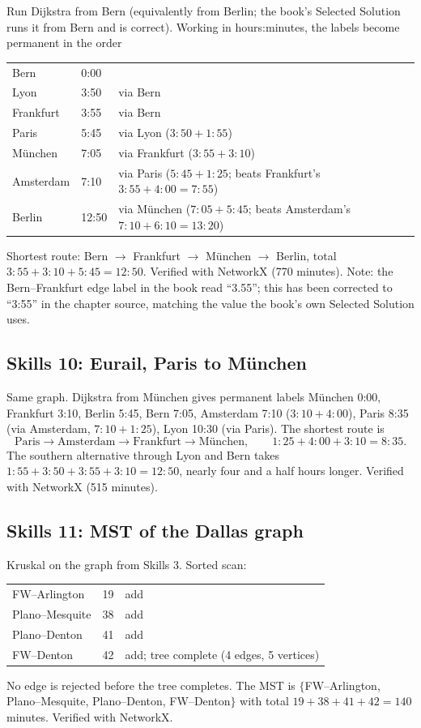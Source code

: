 Run Dijkstra from Bern (equivalently from Berlin; the book's Selected Solution runs it from Bern and is correct). Working in hours:minutes, the labels become permanent in the order
\begin{center}
\begin{tabular}{lll}
Bern & 0:00 & \\
Lyon & 3:50 & via Bern \\
Frankfurt & 3:55 & via Bern \\
Paris & 5:45 & via Lyon ($3{:}50 + 1{:}55$) \\
M\"unchen & 7:05 & via Frankfurt ($3{:}55 + 3{:}10$) \\
Amsterdam & 7:10 & via Paris ($5{:}45 + 1{:}25$; beats Frankfurt's $3{:}55 + 4{:}00 = 7{:}55$) \\
Berlin & 12:50 & via M\"unchen ($7{:}05 + 5{:}45$; beats Amsterdam's $7{:}10 + 6{:}10 = 13{:}20$) \\
\end{tabular}
\end{center}
Shortest route: Bern $\to$ Frankfurt $\to$ M\"unchen $\to$ Berlin, total $3{:}55 + 3{:}10 + 5{:}45 = 12{:}50$. Verified with NetworkX (770 minutes). Note: the Bern--Frankfurt edge label in the book read ``3.55''; this has been corrected to ``3:55'' in the chapter source, matching the value the book's own Selected Solution uses.

\subsection*{Skills 10: Eurail, Paris to M\"unchen}

Same graph. Dijkstra from M\"unchen gives permanent labels M\"unchen 0:00, Frankfurt 3:10, Berlin 5:45, Bern 7:05, Amsterdam 7:10 ($3{:}10 + 4{:}00$), Paris 8:35 (via Amsterdam, $7{:}10 + 1{:}25$), Lyon 10:30 (via Paris). The shortest route is
\[
\text{Paris} \to \text{Amsterdam} \to \text{Frankfurt} \to \text{M\"unchen},
\qquad 1{:}25 + 4{:}00 + 3{:}10 = 8{:}35.
\]
The southern alternative through Lyon and Bern takes $1{:}55 + 3{:}50 + 3{:}55 + 3{:}10 = 12{:}50$, nearly four and a half hours longer. Verified with NetworkX (515 minutes).

\subsection*{Skills 11: MST of the Dallas graph}

Kruskal on the graph from Skills 3. Sorted scan:
\begin{center}
\begin{tabular}{lll}
FW--Arlington & 19 & add \\
Plano--Mesquite & 38 & add \\
Plano--Denton & 41 & add \\
FW--Denton & 42 & add; tree complete (4 edges, 5 vertices) \\
\end{tabular}
\end{center}
No edge is rejected before the tree completes. The MST is $\{$FW--Arlington, Plano--Mesquite, Plano--Denton, FW--Denton$\}$ with total $19 + 38 + 41 + 42 = 140$ minutes. Verified with NetworkX.

